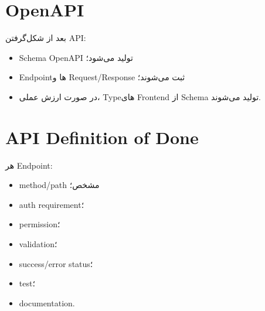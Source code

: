 \section{OpenAPI}

بعد از شکل‌گرفتن API:
\begin{itemize}
  \item Schema OpenAPI تولید می‌شود؛
  \item Endpointها و Request/Response ثبت می‌شوند؛
  \item در صورت ارزش عملی، Typeهای Frontend از Schema تولید می‌شوند.
\end{itemize}

\section{API Definition of Done}

هر Endpoint:
\begin{itemize}
  \item method/path مشخص؛
  \item auth requirement؛
  \item permission؛
  \item validation؛
  \item success/error status؛
  \item test؛
  \item documentation.
\end{itemize}
